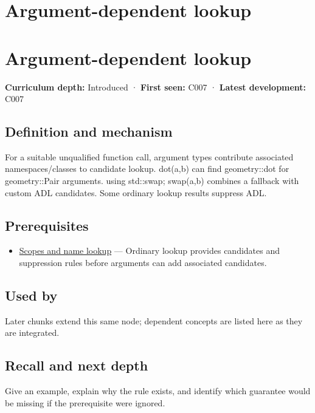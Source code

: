 \hypertarget{appendix-7863714aa97f}{}
\section*{Argument-dependent lookup}
\section{Argument-dependent lookup}\label{argument-dependent-lookup}

\textbf{Curriculum depth:} Introduced · \textbf{First seen:} C007 · \textbf{Latest development:} C007

\subsection{Definition and mechanism}\label{definition-and-mechanism}

For a suitable unqualified function call, argument types contribute associated namespaces/classes to candidate lookup. dot(a,b) can find geometry::dot for geometry::Pair arguments. using std::swap; swap(a,b) combines a fallback with custom ADL candidates. Some ordinary lookup results suppress ADL.

\subsection{Prerequisites}\label{prerequisites}

\begin{itemize}
\tightlist
\item
  \hyperref[appendix-b12b31759da1]{Scopes and name lookup} --- Ordinary lookup provides candidates and suppression rules before arguments can add associated candidates.
\end{itemize}

\subsection{Used by}\label{used-by}

Later chunks extend this same node; dependent concepts are listed here as they are integrated.

\subsection{Recall and next depth}\label{recall-and-next-depth}

Give an example, explain why the rule exists, and identify which guarantee would be missing if the prerequisite were ignored.

